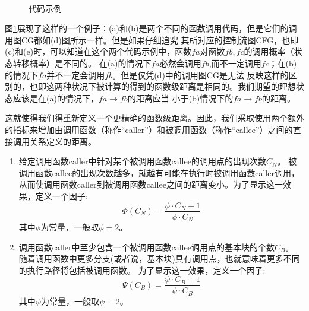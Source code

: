 \documentclass[bachelor]{njupthesis}
\begin{document}
\begin{figure}[htb]
	\centering
	 \\
	\caption{代码示例}
 	\label{pic:code}
\end{figure}

图\ref{pic:code}展现了这样的一个例子：(a)和(b)是两个不同的函数调用代码，但是它们的调用图CG都如(d)图所示一样。但是如果仔细追究
其所对应的控制流图CFG，也即(c)和(e)时，可以知道在这个两个代码示例中，函数$fa$对函数$fb,fc$的调用概率（状态转移概率）是不同的。
在(a)的情况下$fa$必然会调用$fb$,而不一定调用$fc$；在(b)的情况下$fa$并不一定会调用$fb$。但是仅凭(d)中的调用图CG是无法
反映这样的区别的，也即这两种状况下被计算的得到的函数级距离是相同的。我们期望的理想状态应该是在(a)的情况下，$fa \to fb$的距离应当
小于(b)情况下的$fa \to fb$的距离。

这就使得我们得重新定义一个更精确的函数级距离。因此，我们采取使用两个额外的指标来增加由调用函数（称作“caller”）和被调用函数（称作“callee”）之间的直接调用关系定义的距离。
\begin{enumerate}[label=(\arabic*)]
	\item 给定调用函数caller中针对某个被调用函数callee的调用点的出现次数$C_N$。
	被调用函数callee的出现次数越多，就越有可能在执行时被调用函数caller调用，
	从而使调用函数caller到被调用函数callee之间的距离变小。为了显示这一效果，定义一个因子:
	\begin{equation}\label{eq:factor1}
	\Phi (C_N)=\frac{\phi \cdot C_N+1}{\phi \cdot C_N}
	\end{equation}
	其中$\phi$为常量，一般取$\phi=2$。
	\item 调用函数caller中至少包含一个被调用函数callee调用点的基本块的个数$C_B$。
	随着调用函数中更多分支(或者说，基本块)具有调用点，也就意味着更多不同的执行路径将包括被调用函数。
	为了显示这一效果，定义一个因子:
	\begin{equation}\label{eq:factor2}
	\Psi (C_B)=\frac{\psi \cdot C_B+1}{\psi \cdot C_B}
	\end{equation}
	其中$\psi$为常量，一般取$\psi=2$。	
\end{enumerate}
\end{document}
